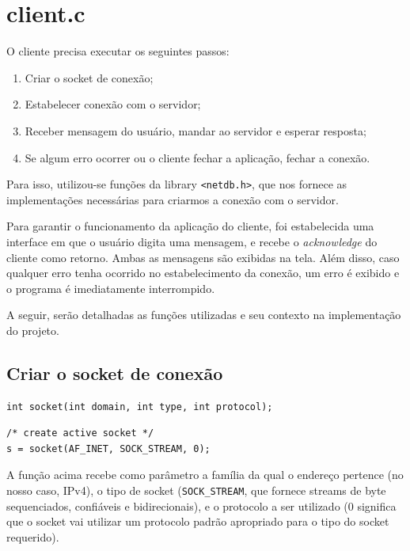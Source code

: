 \documentclass[10pt,twocolumn,letterpaper]{article}
\begin{document}
\section{client.c}
O cliente precisa executar os seguintes passos:

\begin{enumerate}
    \item Criar o socket de conexão;
    \item Estabelecer conexão com o servidor;
    \item Receber mensagem do usuário, mandar ao servidor e esperar resposta;
    \item Se algum erro ocorrer ou o cliente fechar a aplicação, fechar a conexão.
\end{enumerate}

 Para isso, utilizou-se funções da library \texttt{<netdb.h>}, que nos fornece 
 as implementações necessárias para criarmos a conexão com o servidor. 

 Para garantir o funcionamento da aplicação do cliente, foi estabelecida uma 
 interface em que o usuário digita uma mensagem, e recebe o \textit{acknowledge} 
 do cliente como retorno. Ambas as mensagens são exibidas na tela. Além disso, 
 caso qualquer erro tenha ocorrido no estabelecimento da conexão, um erro é 
 exibido e o programa é imediatamente interrompido.

 A seguir, serão detalhadas as funções utilizadas e seu contexto na 
 implementação do projeto.

\subsection{Criar o socket de conexão}

	\begin{lstlisting}[caption={Função utilizada para criação do socket}, label=Algorithm]
int socket(int domain, int type, int protocol);
	\end{lstlisting}

	\begin{lstlisting}[caption={Aplicação da função na implementação do projeto}, label=Algorithm]
/* create active socket */
s = socket(AF_INET, SOCK_STREAM, 0);
	\end{lstlisting}

	A função acima recebe como parâmetro a família da qual o endereço pertence (no nosso caso, IPv4), o tipo de socket (\texttt{SOCK\_STREAM}, que fornece streams de byte sequenciados, confiáveis e bidirecionais), e o protocolo a ser utilizado (0 significa que o socket vai utilizar um protocolo padrão apropriado para o tipo do socket requerido).
\end{document}
